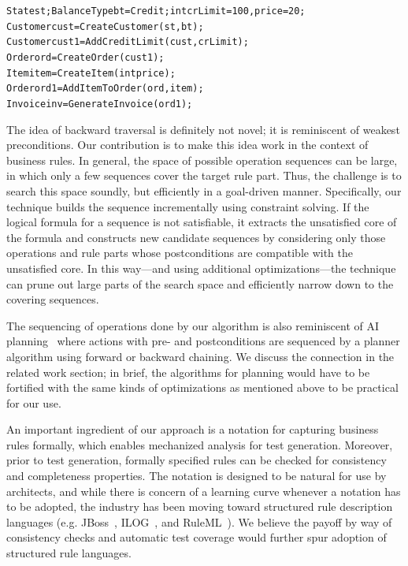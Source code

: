 \vspace*{-4pt}%
{\scriptsize
\begin{alltt}
 State st; BalanceType bt = Credit; int crLimit = 100, price = 20;
 Customer cust = CreateCustomer(st, bt);
 Customer cust1 = AddCreditLimit(cust, crLimit);
 Order ord = CreateOrder(cust1);
 Item item = CreateItem(int price);
 Order ord1 = AddItemToOrder(ord, item);
 Invoice inv = GenerateInvoice(ord1);  
\end{alltt}}%
\vspace*{-5pt}

The idea of backward traversal is definitely not novel; it is reminiscent of
weakest preconditions.  Our contribution is to make this idea work in the
context of business rules.  In general, the space of possible operation
sequences can be large, in which only a few sequences cover the target rule
part. Thus, the challenge is to search this space soundly, but efficiently in a
goal-driven manner. Specifically, our technique builds the sequence
incrementally using constraint solving. If the logical formula for a sequence is
not satisfiable, it extracts the unsatisfied core of the formula and constructs
new candidate sequences by considering only those operations and rule parts
whose postconditions are compatible with the unsatisfied core. In this way---and
using additional optimizations---the technique can prune out large parts of the
search space and efficiently narrow down to the covering sequences.

The sequencing of operations done by our algorithm is also reminiscent of AI
planning~\cite{Weld94} where actions with pre- and postconditions are sequenced
by a planner algorithm using forward or backward chaining. We discuss the
connection in the related work section; in brief, the algorithms for planning
would have to be fortified with the same kinds of optimizations as mentioned
above to be practical for our use.

An important ingredient of our approach is a notation for capturing business
rules formally, which enables mechanized analysis for test generation. Moreover,
prior to test generation, formally specified rules can be checked for
consistency and completeness properties.  The notation is designed to be natural
for use by architects, and while there is concern of a learning curve whenever a
notation has to be adopted, the industry has been moving toward
structured rule description languages (e.g. JBoss~\cite{JBoss},
ILOG~\cite{ILog}, and RuleML~\cite{RuleML}).  We believe the payoff by way of
consistency checks and automatic test coverage would further spur adoption of
structured rule languages.

